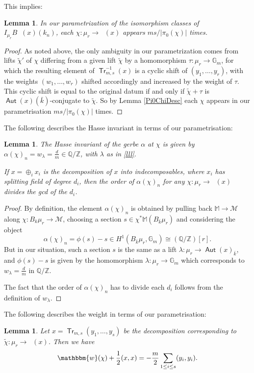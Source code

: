 \documentclass{article}
\DeclareMathOperator{\Aut}{\mathsf{Aut}}
\DeclareMathOperator{\uAut}{\underline{\mathsf{Aut}}}
\DeclareMathOperator{\Tr}{\mathsf{Tr}}
\newcommand{\BG}{{\mathbb{G}}}
\newcommand{\BM}{{\mathbb{M}}}
\newcommand{\BQ}{{\mathbb{Q}}}
\newcommand{\BZ}{{\mathbb{Z}}}
\newcommand{\Bw}{\mathbbm{w}}
\newcommand{\CM}{{\mathcal M}}
\theoremstyle{definition}
\theoremstyle{plain}
\newtheorem{lemma}[definition]{Lemma}
\begin{document}
This implies:
\begin{lemma}
    In our parametrization of the isomorphism classes of $I_{\mu_r}B\uAut(x)(k_n)$, each $\chi \colon \mu_r \to \uAut(x)$ appears $ms/|\pi_0(\chi)|$ times.
\end{lemma}
\begin{proof}
    As noted above, the only ambiguity in our parametrization comes from lifts $\tilde\chi'$ of $\chi$ differing from a given lift $\tilde\chi$ by a homomorphism $\tau\colon \mu_r \to \BG_m$, for which the resulting element of $\Tr^{-1}_{m,s}(x)$ is a cyclic shift of $(y_1,\hdots,y_r)$, with the weights $(w_1,\hdots,w_r)$ shifted accordingly and increased by the weight of $\tau$. This cyclic shift is equal to the original datum if and only if $\tilde\chi+\tau$ is $\Aut(x)(\bar k)$-conjugate to $\tilde\chi$. So by Lemma \ref{Pi0ChiDesc} each $\chi$ appears in our parametrisation $ms/|\pi_0(\chi)|$ times.
\end{proof}


 The following describes the Hasse invariant in terms of our parametrisation:
\begin{lemma}\label{gerby}
    The Hasse invariant of the gerbe $\alpha$ at $\chi$ is given by $\alpha(\chi)_n=w_\lambda = \frac{d}{m} \in \BQ/\BZ$, with $\lambda$ as in \eqref{lll}.
    
    If $x= \oplus_i x_i$ is the decomposition of $x$ into  indecomposables, where $x_i$ has splitting field of degree $d_i$, then the order of $\alpha(\chi)_n$ for any $\chi\colon \mu_r \to \uAut(x)$ divides the gcd of the $d_i$. 
\end{lemma}
\begin{proof}
    By definition, the element $\alpha(\chi)_n$ is obtained by pulling back $\BM \to \CM$ along $\chi\colon B_k \mu_r \to \CM$, choosing a section $s \in \chi^*\BM(B_{\bar k} \mu_r)$ and considering the object
    \begin{equation*}
        \alpha(\chi)_n=\phi(s)-s \in H^1(B_{\bar k} \mu_r,\BG_m)\cong (\BQ/\BZ)[r].
    \end{equation*}
    But in our situation, such a section $s$ is the same as a lift $\lambda\colon \mu_r \to \Aut(x)_{\bar k}$, and $\phi(s)-s$ is given by the homomorphism $\lambda\colon \mu_r \to \BG_m$ which corresponds to $w_\lambda = \frac{d}{m}$ in $\BQ/\BZ$.

    The fact that the order of $\alpha(\chi)_n$ has to divide each $d_i$ follows from the definition of $w_\lambda$. 
\end{proof}
The following describes the weight in terms of our parametrisation:
\begin{lemma} Let $x =\Tr_{m,s} (y_1,\hdots,y_s)$ be the decomposition corresponding to $\tilde\chi: \mu_r \to \uAut(x)$. Then we have
\[ \Bw(\chi) + \frac{1}{2}(x,x)= -\frac{m}{2} \sum_{1\leq i\leq s} (y_i,y_i).\]

\end{lemma}
\end{document}
